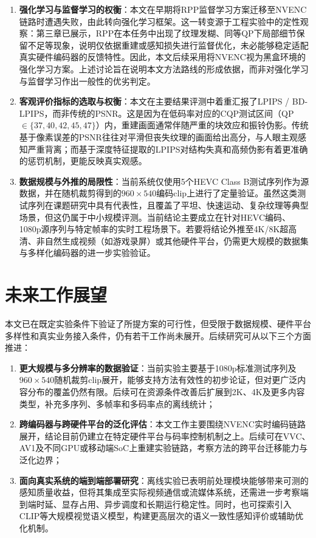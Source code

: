 \begin{enumerate}
  \item \textbf{强化学习与监督学习的权衡}：本文在早期将RPP监督学习方案迁移至NVENC链路时遭遇失败，由此转向强化学习框架。这一转变源于工程实验中的定性观察：第三章已展示，RPP在本任务中出现了纹理发糊、同等QP下局部细节保留不足等现象，说明仅依据重建或感知损失进行监督优化，未必能够稳定适配真实硬件编码器的反馈特性。因此，本文后续采用将NVENC视为黑盒环境的强化学习方案。上述讨论旨在说明本文方法路线的形成依据，而非对强化学习与监督学习作出一般性的优劣判定。
  \item \textbf{客观评价指标的选取与权衡}：本文在主要结果评测中着重汇报了LPIPS / BD-LPIPS，而非传统的PSNR。这是因为在低码率对应的CQP测试区间（QP$\in\{37,40,42,45,47\}$）内，重建画面通常伴随严重的块效应和振铃伪影。传统基于像素误差的PSNR往往对平滑但丧失纹理的画面给出高分，与人眼主观感知严重背离；而基于深度特征提取的LPIPS对结构失真和高频伪影有着更准确的惩罚机制，更能反映真实观感。
  \item \textbf{数据规模与外推的局限性}：当前系统仅使用5个HEVC Class B测试序列作为源数据，并在随机裁剪得到的$960\times540$编码clip上进行了定量验证。虽然这类测试序列在课题研究中具有代表性，且覆盖了平坦、快速运动、复杂纹理等典型场景，但这仍属于中小规模评测。当前结论主要成立在针对HEVC编码、1080p源序列与特定帧率的实时工程场景下。若要将结论外推至4K/8K超高清、非自然生成视频（如游戏录屏）或其他硬件平台，仍需更大规模的数据集与多样化编码器的进一步实验验证。
\end{enumerate}

\section{未来工作展望}

本文已在既定实验条件下验证了所提方案的可行性，但受限于数据规模、硬件平台多样性和真实业务接入条件，仍有若干工作尚未展开。后续研究可从以下三个方面推进：

\begin{enumerate}
  \item \textbf{更大规模与多分辨率的数据验证}：当前实验主要基于1080p标准测试序列及$960\times540$随机裁剪clip展开，能够支持方法有效性的初步论证，但对更广泛内容分布的覆盖仍然有限。后续可在资源条件改善后扩展到2K、4K及更多内容类型，补充多序列、多帧率和多码率点的离线统计；

  \item \textbf{跨编码器与跨硬件平台的泛化评估}：本文工作主要围绕NVENC实时编码链路展开，结论目前仍建立在特定硬件平台与码率控制机制之上。后续可在VVC、AV1及不同GPU或移动端SoC上重建实验链路，考察方法的跨平台迁移能力与泛化边界；

  \item \textbf{面向真实系统的端到端部署研究}：离线实验已表明前处理模块能够带来可测的感知质量收益，但将其集成至实际视频通信或流媒体系统，还需进一步考察端到端时延、显存占用、异步调度和长期运行稳定性。同时，也可探索引入CLIP等大规模视觉语义模型\cite{Radford2021LearningTV}，构建更高层次的语义一致性感知评价或辅助优化机制。
\end{enumerate}

